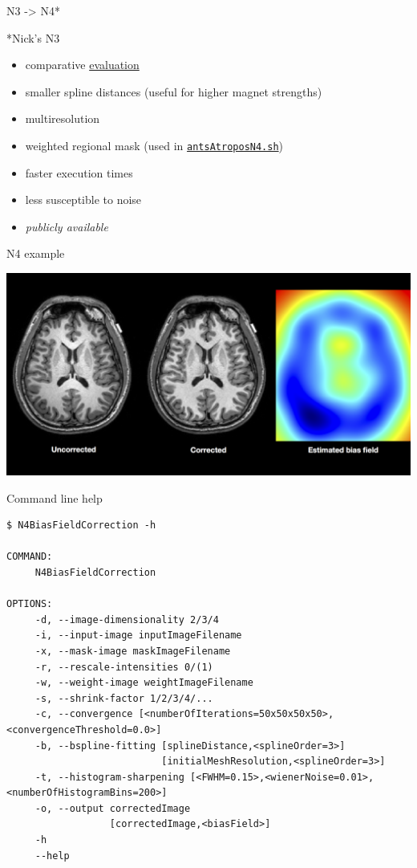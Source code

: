 \documentclass[ignorenonframetext,]{beamer}
\begin{document}
\begin{frame}{N3 -\textgreater{} N4*}

*Nick's N3

\begin{itemize}
\item
  comparative
  \href{http://www.ncbi.nlm.nih.gov/pubmed/20378467}{evaluation}
\item
  smaller spline distances (useful for higher magnet strengths)
\item
  multiresolution
\item
  weighted regional mask (used in
  \href{https://github.com/stnava/ANTs/blob/master/Scripts/antsAtroposN4.sh}{\texttt{antsAtroposN4.sh}})
\item
  faster execution times
\item
  less susceptible to noise
\item
  \emph{publicly available}
\end{itemize}

\end{frame}

\begin{frame}{N4 example}

\includegraphics{./Figs/KKI2009_MPRAGE_slice150.png}

\end{frame}

\begin{frame}[fragile]{Command line help}

\begin{verbatim}
$ N4BiasFieldCorrection -h

COMMAND:
     N4BiasFieldCorrection

OPTIONS:
     -d, --image-dimensionality 2/3/4
     -i, --input-image inputImageFilename
     -x, --mask-image maskImageFilename
     -r, --rescale-intensities 0/(1)
     -w, --weight-image weightImageFilename
     -s, --shrink-factor 1/2/3/4/...
     -c, --convergence [<numberOfIterations=50x50x50x50>,<convergenceThreshold=0.0>]
     -b, --bspline-fitting [splineDistance,<splineOrder=3>]
                           [initialMeshResolution,<splineOrder=3>]
     -t, --histogram-sharpening [<FWHM=0.15>,<wienerNoise=0.01>,<numberOfHistogramBins=200>]
     -o, --output correctedImage
                  [correctedImage,<biasField>]
     -h
     --help
\end{verbatim}

\end{frame}
\end{document}
